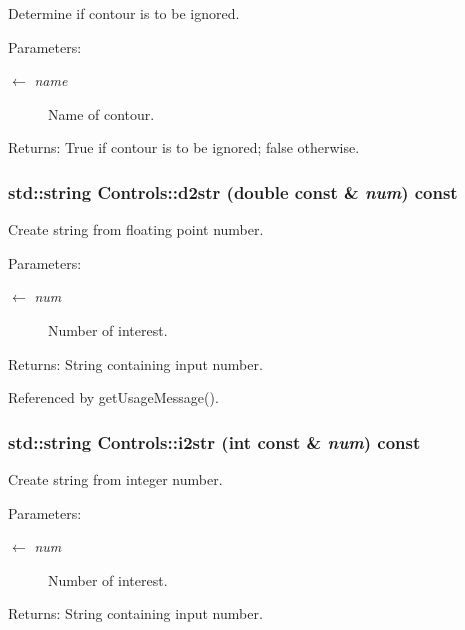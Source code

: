 Determine if contour is to be ignored. \begin{Desc}
\item[Parameters:]
\begin{description}
\item[\mbox{$\leftarrow$} {\em name}]Name of contour. \end{description}
\end{Desc}
\begin{Desc}
\item[Returns:]True if contour is to be ignored; false otherwise. \end{Desc}
\hypertarget{classControls_77c3bc1e6a73f2d3df39e773e2dc1ea8}{
\subsubsection[d2str]{\setlength{\rightskip}{0pt plus 5cm}std::string Controls::d2str (double const \& {\em num}) const}}
\label{classControls_77c3bc1e6a73f2d3df39e773e2dc1ea8}


Create string from floating point number. \begin{Desc}
\item[Parameters:]
\begin{description}
\item[\mbox{$\leftarrow$} {\em num}]Number of interest. \end{description}
\end{Desc}
\begin{Desc}
\item[Returns:]String containing input number. \end{Desc}


Referenced by getUsageMessage().\hypertarget{classControls_c90675a41d4cce28524cb6b929d8cc11}{
\subsubsection[i2str]{\setlength{\rightskip}{0pt plus 5cm}std::string Controls::i2str (int const \& {\em num}) const}}
\label{classControls_c90675a41d4cce28524cb6b929d8cc11}


Create string from integer number. \begin{Desc}
\item[Parameters:]
\begin{description}
\item[\mbox{$\leftarrow$} {\em num}]Number of interest. \end{description}
\end{Desc}
\begin{Desc}
\item[Returns:]String containing input number. \end{Desc}


